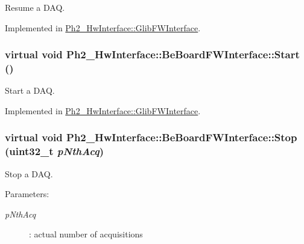 Resume a DAQ. 



Implemented in \hyperlink{class_ph2___hw_interface_1_1_glib_f_w_interface_edd3abfb576016701da27fabc975ac13}{Ph2\_\-Hw\-Interface::Glib\-FWInterface}.\hypertarget{class_ph2___hw_interface_1_1_be_board_f_w_interface_03bccd64fb4656dc0f9735618860ca35}{
\subsubsection[Start]{\setlength{\rightskip}{0pt plus 5cm}virtual void Ph2\_\-Hw\-Interface::Be\-Board\-FWInterface::Start ()}}
\label{class_ph2___hw_interface_1_1_be_board_f_w_interface_03bccd64fb4656dc0f9735618860ca35}


Start a DAQ. 



Implemented in \hyperlink{class_ph2___hw_interface_1_1_glib_f_w_interface_debd47ee3a84dbb8b60f6dd521921aac}{Ph2\_\-Hw\-Interface::Glib\-FWInterface}.\hypertarget{class_ph2___hw_interface_1_1_be_board_f_w_interface_34c0dc403995e843eccbb82dd73f5b51}{
\subsubsection[Stop]{\setlength{\rightskip}{0pt plus 5cm}virtual void Ph2\_\-Hw\-Interface::Be\-Board\-FWInterface::Stop (uint32\_\-t {\em p\-Nth\-Acq})}}
\label{class_ph2___hw_interface_1_1_be_board_f_w_interface_34c0dc403995e843eccbb82dd73f5b51}


Stop a DAQ. 

\begin{Desc}
\item[Parameters:]
\begin{description}
\item[{\em p\-Nth\-Acq}]: actual number of acquisitions \end{description}
\end{Desc}


